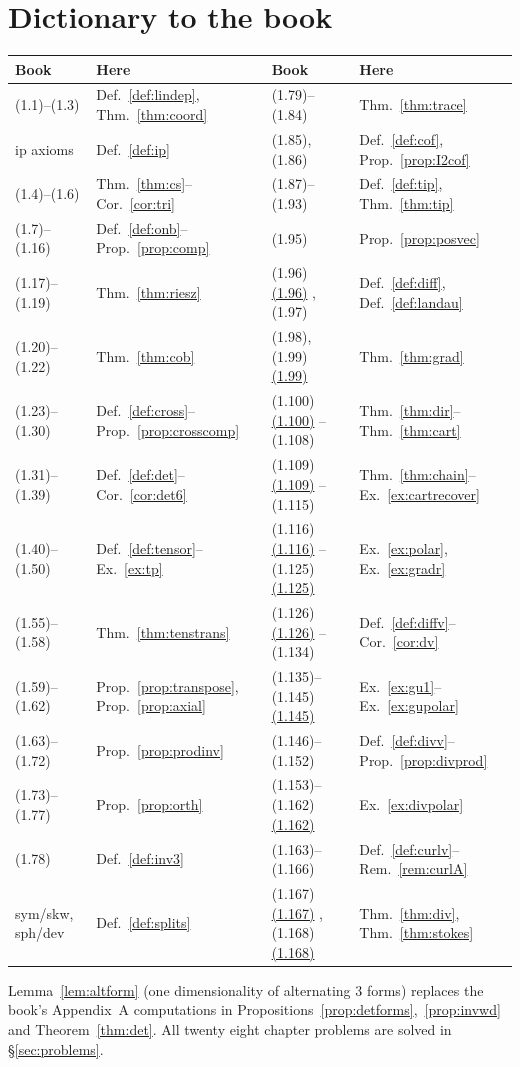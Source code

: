\documentclass[17pt,a4paper]{extreport}
\makeatletter
\theoremstyle{scplain}
\theoremstyle{scdefn}
\theoremstyle{scplain}
\newcommand{\eqr@do}[1]{%
  \begingroup
    \@ifundefined{eqal@#1}{\def\eqr@t{#1}}%
                          {\edef\eqr@t{\csname eqal@#1\endcsname}}%
    \@ifundefined{r@eq:\eqr@t}%
      {\textup{(#1)}}%
      {\hyperref[eq:\eqr@t]{\textup{(#1)}}}%
  \endgroup}
\DeclareRobustCommand{\eqr}[1]{%
  \ifmmode\text{\eqr@do{#1}}\else\eqr@do{#1}\fi}
\makeatother
\begin{document}
\appendix
\chapter{Dictionary to the book}\label{app:dict}

\renewcommand{\arraystretch}{1.2}
\begin{center}\footnotesize
\begin{tabular}{@{}ll@{\hspace{1.3em}}ll@{}}
\hline
Book & Here & Book & Here\\
\hline
(1.1)--(1.3) & Def.~\ref{def:lindep}, Thm.~\ref{thm:coord}
 & (1.79)--(1.84) & Thm.~\ref{thm:trace}\\
ip axioms & Def.~\ref{def:ip}
 & (1.85), (1.86) & Def.~\ref{def:cof}, Prop.~\ref{prop:I2cof}\\
(1.4)--(1.6) & Thm.~\ref{thm:cs}--Cor.~\ref{cor:tri}
 & (1.87)--(1.93) & Def.~\ref{def:tip}, Thm.~\ref{thm:tip}\\
(1.7)--(1.16) & Def.~\ref{def:onb}--Prop.~\ref{prop:comp}
 & (1.95) & Prop.~\ref{prop:posvec}\\
(1.17)--(1.19) & Thm.~\ref{thm:riesz}
 & \eqr{1.96}, (1.97) & Def.~\ref{def:diff}, Def.~\ref{def:landau}\\
(1.20)--(1.22) & Thm.~\ref{thm:cob}
 & (1.98), \eqr{1.99} & Thm.~\ref{thm:grad}\\
(1.23)--(1.30) & Def.~\ref{def:cross}--Prop.~\ref{prop:crosscomp}
 & \eqr{1.100}--(1.108) & Thm.~\ref{thm:dir}--Thm.~\ref{thm:cart}\\
(1.31)--(1.39) & Def.~\ref{def:det}--Cor.~\ref{cor:det6}
 & \eqr{1.109}--(1.115) & Thm.~\ref{thm:chain}--Ex.~\ref{ex:cartrecover}\\
(1.40)--(1.50) & Def.~\ref{def:tensor}--Ex.~\ref{ex:tp}
 & \eqr{1.116}--\eqr{1.125} & Ex.~\ref{ex:polar}, Ex.~\ref{ex:gradr}\\
(1.55)--(1.58) & Thm.~\ref{thm:tenstrans}
 & \eqr{1.126}--(1.134) & Def.~\ref{def:diffv}--Cor.~\ref{cor:dv}\\
(1.59)--(1.62) & Prop.~\ref{prop:transpose}, Prop.~\ref{prop:axial}
 & (1.135)--\eqr{1.145} & Ex.~\ref{ex:gu1}--Ex.~\ref{ex:gupolar}\\
(1.63)--(1.72) & Prop.~\ref{prop:prodinv}
 & (1.146)--(1.152) & Def.~\ref{def:divv}--Prop.~\ref{prop:divprod}\\
(1.73)--(1.77) & Prop.~\ref{prop:orth}
 & (1.153)--\eqr{1.162} & Ex.~\ref{ex:divpolar}\\
(1.78) & Def.~\ref{def:inv3}
 & (1.163)--(1.166) & Def.~\ref{def:curlv}--Rem.~\ref{rem:curlA}\\
sym/skw, sph/dev & Def.~\ref{def:splits}
 & \eqr{1.167}, \eqr{1.168} & Thm.~\ref{thm:div}, Thm.~\ref{thm:stokes}\\
\hline
\end{tabular}
\end{center}

\medskip\noindent
Lemma~\ref{lem:altform} (one dimensionality of alternating $3$ forms)
replaces the book's Appendix~A computations in
Propositions~\ref{prop:detforms},~\ref{prop:invwd} and
Theorem~\ref{thm:det}. All twenty eight chapter problems are solved in
\S\ref{sec:problems}.
\end{document}
